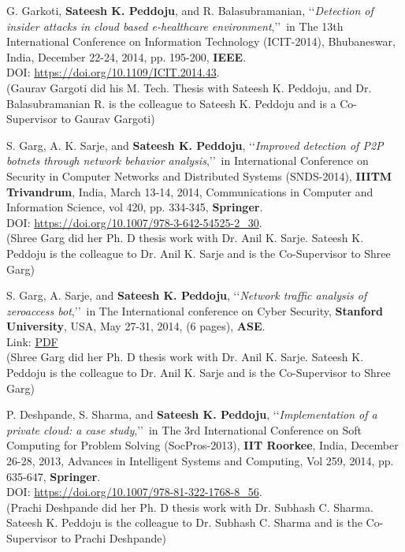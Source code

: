 \begin{etaremune}
	\item
	G. Garkoti, \textbf{Sateesh K. Peddoju}, and R. Balasubramanian, \lq\lq \textit{Detection of insider attacks in cloud based e-healthcare environment},\rq\rq\, in The 13th International Conference on Information Technology (ICIT-2014), Bhubaneswar, India, December 22-24, 2014, pp. 195-200,  \textbf{IEEE}. \\DOI: \url{https://doi.org/10.1109/ICIT.2014.43}. \\(Gaurav Gargoti did his M. Tech. Thesis with Sateesh K. Peddoju, and Dr. Balasubramanian R. is the colleague to Sateesh K. Peddoju and is a Co-Supervisor to Gaurav Gargoti)

	
	\item
	S. Garg, A. K. Sarje, and \textbf{Sateesh K. Peddoju}, \lq\lq \textit{Improved detection of P2P botnets through network behavior analysis},\rq\rq\, in International Conference on Security in Computer Networks and Distributed Systems (SNDS-2014), \textbf{IIITM Trivandrum}, India, March 13-14, 2014, Communications in Computer and Information Science, vol 420, pp. 334-345, \textbf{Springer}. \\DOI: \url{https://doi.org/10.1007/978-3-642-54525-2_30}. \\(Shree Garg did her Ph. D thesis work with Dr. Anil K. Sarje.  Sateesh K. Peddoju is the colleague to Dr. Anil K. Sarje and is the Co-Supervisor to Shree Garg)

	
	\item
	S. Garg, A. Sarje, and \textbf{Sateesh K. Peddoju}, \lq\lq \textit{Network traffic analysis of zeroaccess bot},\rq\rq\, in The International conference on Cyber Security, \textbf{Stanford University}, USA, May 27-31, 2014, (6 pages), \textbf{ASE}. \\Link: \href{https://pdfs.semanticscholar.org/32af/3ef10f049d7ca8e9d7240d2b0cbd94336e6c.pdf}{PDF} \\(Shree Garg did her Ph. D thesis work with Dr. Anil K. Sarje.  Sateesh K. Peddoju is the colleague to Dr. Anil K. Sarje and is the Co-Supervisor to Shree Garg)

	
	\item
	P. Deshpande, S. Sharma, and \textbf{Sateesh K. Peddoju}, \lq\lq \textit{Implementation of a private cloud: a case study},\rq\rq\, in The 3rd International Conference on Soft Computing for Problem Solving (SocPros-2013), \textbf{IIT Roorkee}, India, December 26-28, 2013, Advances in Intelligent Systems and Computing, Vol 259, 2014, pp. 635-647, \textbf{Springer}. \\DOI: \url{https://doi.org/10.1007/978-81-322-1768-8_56}. \\(Prachi Deshpande did her Ph. D thesis work with Dr. Subhash C. Sharma. Sateesh K. Peddoju is the colleague to Dr. Subhash C. Sharma and is the Co-Supervisor to Prachi Deshpande)


\end{etaremune}
